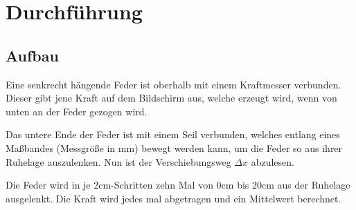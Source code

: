 \section{Durchführung}
\label{sec:Durchführung}

\subsection{Aufbau}
Eine senkrecht hängende Feder ist oberhalb mit einem Kraftmesser verbunden. Dieser gibt jene Kraft 
auf dem Bildschirm aus, welche erzeugt wird, wenn von unten an der Feder gezogen wird.


Das untere Ende der Feder ist mit einem Seil verbunden, welches entlang eines 
Maßbandes (Messgröße in mm) bewegt werden kann, um die Feder so aus ihrer 
Ruhelage auszulenken. Nun ist der  Verschiebungsweg $\Delta x$ abzulesen.


Die Feder wird in je 2cm-Schritten zehn Mal von 0cm bis 20cm aus der Ruhelage 
ausgelenkt. Die Kraft wird jedes mal abgetragen und ein Mittelwert berechnet.